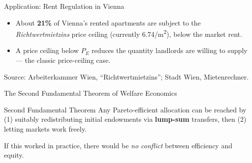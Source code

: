 \documentclass[11pt,aspectratio=169]{beamer}
\newcommand{\srcnote}[1]{{\footnotesize\color{wugray}Source: #1}}
\begin{document}
\begin{frame}{Application: Rent Regulation in Vienna}
  \footnotesize
  \begin{itemize}
    \item About \textbf{21\%} of Vienna's rented apartments are subject to the \emph{Richtwertmietzins} price ceiling (currently \texteuro{}6.74/m\textsuperscript{2}), below the market rent.
    \item A price ceiling below $P_E$ reduces the quantity landlords are willing to supply --- the classic price-ceiling case.
  \end{itemize}
  \begin{center}
  \end{center}
  \srcnote{Arbeiterkammer Wien, ``Richtwertmietzins''; Stadt Wien, Mietenrechner.}
\end{frame}

\begin{frame}{The Second Fundamental Theorem of Welfare Economics}
  \begin{alertblock}{Second Fundamental Theorem}
    Any Pareto-efficient allocation can be reached by (1) suitably redistributing initial endowments via \textbf{lump-sum} transfers, then (2) letting markets work freely.
  \end{alertblock}
  \centering
  If this worked in practice, there would be \emph{no conflict} between efficiency and equity.
\end{frame}
\end{document}
